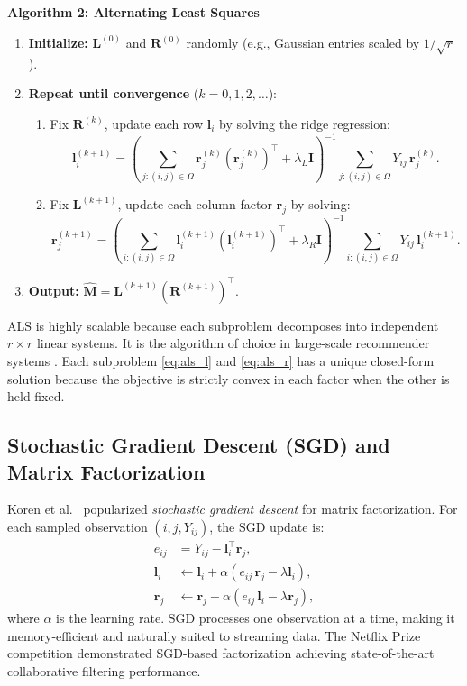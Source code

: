 \documentclass[conference]{IEEEtran}
\begin{document}
\textbf{Algorithm 2: Alternating Least Squares}
\begin{enumerate}
  \item \textbf{Initialize:} $\mathbf{L}^{(0)}$ and $\mathbf{R}^{(0)}$ randomly (e.g., Gaussian entries scaled by $1/\sqrt{r}$).
  \item \textbf{Repeat until convergence} ($k = 0, 1, 2, \ldots$):
    \begin{enumerate}
      \item Fix $\mathbf{R}^{(k)}$, update each row $\mathbf{l}_i$ by solving the ridge regression:
        \begin{equation}
          \mathbf{l}_i^{(k+1)} = \left(\sum_{j:(i,j)\in\Omega} \mathbf{r}_j^{(k)}(\mathbf{r}_j^{(k)})^\top + \lambda_L \mathbf{I}\right)^{-1} \sum_{j:(i,j)\in\Omega} Y_{ij}\,\mathbf{r}_j^{(k)}.
          \label{eq:als_l}
        \end{equation}
      \item Fix $\mathbf{L}^{(k+1)}$, update each column factor $\mathbf{r}_j$ by solving:
        \begin{equation}
          \mathbf{r}_j^{(k+1)} = \left(\sum_{i:(i,j)\in\Omega} \mathbf{l}_i^{(k+1)}(\mathbf{l}_i^{(k+1)})^\top + \lambda_R \mathbf{I}\right)^{-1} \sum_{i:(i,j)\in\Omega} Y_{ij}\,\mathbf{l}_i^{(k+1)}.
          \label{eq:als_r}
        \end{equation}
    \end{enumerate}
  \item \textbf{Output:} $\hat{\mathbf{M}} = \mathbf{L}^{(k+1)}(\mathbf{R}^{(k+1)})^\top$.
\end{enumerate}

ALS is highly scalable because each subproblem decomposes into independent $r \times r$ linear systems. It is the algorithm of choice in large-scale recommender systems \cite{zhou2008large}. Each subproblem \eqref{eq:als_l} and \eqref{eq:als_r} has a unique closed-form solution because the objective is strictly convex in each factor when the other is held fixed.

\subsection{Stochastic Gradient Descent (SGD) and Matrix Factorization}

Koren et al.\ \cite{koren2009matrix} popularized \emph{stochastic gradient descent} for matrix factorization. For each sampled observation $(i,j,Y_{ij})$, the SGD update is:
\begin{align}
  e_{ij} &= Y_{ij} - \mathbf{l}_i^\top \mathbf{r}_j, \label{eq:sgd_err}\\
  \mathbf{l}_i &\leftarrow \mathbf{l}_i + \alpha (e_{ij}\,\mathbf{r}_j - \lambda \mathbf{l}_i), \label{eq:sgd_l}\\
  \mathbf{r}_j &\leftarrow \mathbf{r}_j + \alpha (e_{ij}\,\mathbf{l}_i - \lambda \mathbf{r}_j), \label{eq:sgd_r}
\end{align}
where $\alpha$ is the learning rate. SGD processes one observation at a time, making it memory-efficient and naturally suited to streaming data. The Netflix Prize competition \cite{bell2007lessons} demonstrated SGD-based factorization achieving state-of-the-art collaborative filtering performance.
\end{document}
